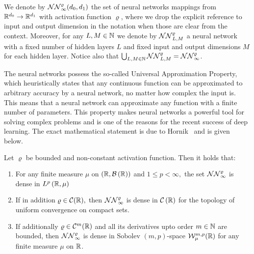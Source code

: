 We denote by $\mathcal{NN}_{\infty}^{\varrho}(d_0,d_1)$ the set of neural networks mappings from $\mathbb{R}^{d_0} \rightarrow \mathbb{R}^{d_1}$ with activation function $\varrho$, where we drop the explicit reference to input and output dimension in the notation when those are clear from the context. %
Moreover, for any $L, M \in \mathbb{N}$ we denote by $\mathcal{NN}_{L, M}^\varrho$ a neural network with a fixed number of hidden layers $L$ and fixed input and output dimensions $M$ for each hidden layer. %
Notice also that $\bigcup_{L,M\in\mathbb{N}}\mathcal{NN}_{L,M}^\varrho = \mathcal{NN}_{\infty}^\varrho$.

The neural networks possess the so-called Universal Approximation Property, which heuristically states that any continuous function can be approximated to arbitrary accuracy by a neural network, no matter how complex the input is. This means that a neural network can approximate any function with a finite number of parameters. This property makes neural networks a powerful tool for solving complex problems and is one of the reasons for the recent success of deep learning. The exact mathematical statement is due to Hornik~\cite{Hornik1991ApproximationNetworks} and is given below.

\begin{theorem}\label{thm:UAT}
Let $\varrho$ be bounded and
non-constant activation function. Then it holds that:
\begin{enumerate}
\item For any finite measure $\mu$ on $\left(\mathbb{R}, \mathcal{B}\left(\mathbb{R}\right)\right)$ and $1 \leq p<\infty,$ the set
$\mathcal{NN}_{\infty}^{\varrho}$ is dense in $L^{p}\left(\mathbb{R}, \mu\right)$
\item If in addition $\varrho \in \mathcal{C}(\mathbb{R}),$ then $\mathcal{NN}_{\infty}^{\varrho}$ is dense in $\mathcal{C}\left(\mathbb{R}\right)$ for the
topology of uniform convergence on compact sets.
\item If additionally $\varrho\in \mathcal{C}^m(\mathbb{R})$ and all its derivatives upto order $m\in\mathbb{N}$ are bounded, then $\mathcal{NN}_{\infty}^{\varrho}$ is dense in Sobolev $(m,p)$-space $\mathcal{W}^{m,p}_{\mu}(\mathbb{R})$ for any finite measure $\mu$ on $\mathbb{R}$.
\end{enumerate}
\end{theorem}

